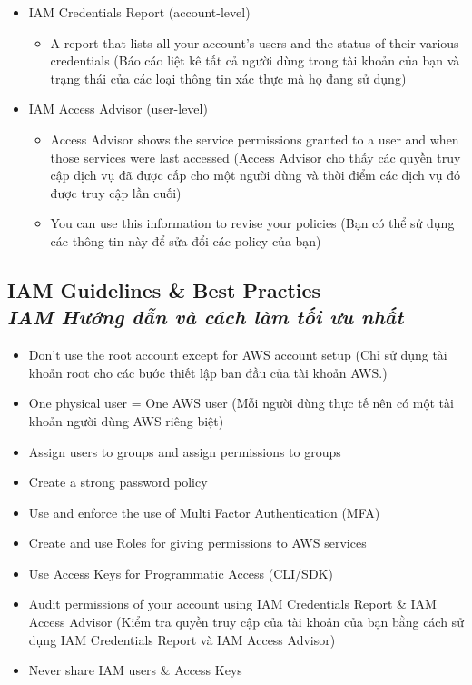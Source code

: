 \begin{itemize}
	\item IAM Credentials Report (account-level)
	\begin{itemize}
		\item A report that lists all your account's users and the status of their various credentials (Báo cáo liệt kê tất cả người dùng trong tài khoản của bạn và trạng thái của các loại thông tin xác thực mà họ đang sử dụng)
	\end{itemize}
	\item IAM Access Advisor (user-level)
	\begin{itemize}
		\item Access Advisor shows the service permissions granted to a user and when those services were last accessed (Access Advisor cho thấy các quyền truy cập dịch vụ đã được cấp cho một người dùng và thời điểm các dịch vụ đó được truy cập lần cuối)
		\item You can use this information to revise your policies (Bạn có thể sử dụng các thông tin này để sửa đổi các policy của bạn)
	\end{itemize}
\end{itemize}

\subsection[IAM Guidelines \& Best Practies]{IAM Guidelines \& Best Practies \\ \textit{IAM Hướng dẫn và cách làm tối ưu nhất}}

\begin{itemize}
	\item Don't use the root account except for AWS account setup (Chỉ sử dụng tài khoản root cho các bước thiết lập ban đầu của tài khoản AWS.)
	\item One physical user = One AWS user (Mỗi người dùng thực tế nên có một tài khoản người dùng AWS riêng biệt)
	\item Assign users to groups and assign permissions to groups
	\item Create a strong password policy
	\item Use and enforce the use of Multi Factor Authentication (MFA)
	\item Create and use Roles for giving permissions to AWS services 
	\item Use Access Keys for Programmatic Access (CLI/SDK)
	\item Audit permissions of your account using IAM Credentials Report \& IAM Access Advisor (Kiểm tra quyền truy cập của tài khoản của bạn bằng cách sử dụng IAM Credentials Report và IAM Access Advisor)
	\item Never share IAM users \& Access Keys
\end{itemize}



